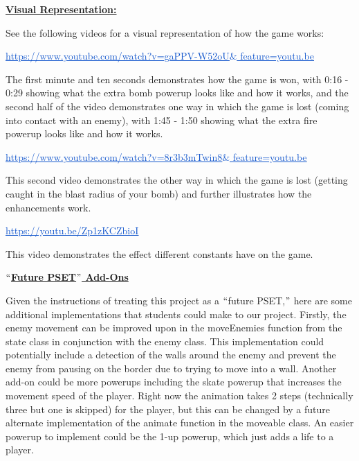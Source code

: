 \documentclass[12pt]{article}
\begin{document}
\vspace{\baselineskip}
\textbf{\uline{Visual Representation:}}\par

See the following videos for a visual representation of how the game works: \par

\href{https://www.youtube.com/watch?v=gaPPV-W52oU&feature=youtu.be}{\textcolor[HTML]{1155CC}{\uline{https://www.youtube.com/watch?v=gaPPV-W52oU$\&$ feature=youtu.be}}} \par

The first minute and ten seconds demonstrates how the game is won, with 0:16 - 0:29 showing what the extra bomb powerup looks like and how it works, and the second half of the video demonstrates one way in which the game is lost (coming into contact with an enemy), with 1:45 - 1:50 showing what the extra fire powerup looks like and how it works.\par

\href{https://www.youtube.com/watch?v=8r3b3mTwin8&feature=youtu.be}{\textcolor[HTML]{1155CC}{\uline{https://www.youtube.com/watch?v=8r3b3mTwin8$\&$ feature=youtu.be}}}\par

This second video demonstrates the other way in which the game is lost (getting caught in the blast radius of your bomb) and further illustrates how the enhancements work.\par

\href{https://youtu.be/Zp1zKCZbioI}{\textcolor[HTML]{1155CC}{\uline{https://youtu.be/Zp1zKCZbioI}}}\par

This video demonstrates the effect different constants have on the game.\par


\vspace{\baselineskip}
\textbf{\uline{$``$Future PSET$"$  Add-Ons}}\par

Given the instructions of treating this project as a $``$future PSET,$"$  here are some additional implementations that students could make to our project. Firstly, the enemy movement can be improved upon in the moveEnemies function from the state class in conjunction with the enemy class. This implementation could potentially include a detection of the walls around the enemy and prevent the enemy from pausing on the border due to trying to move into a wall. Another add-on could be more powerups including the skate powerup that increases the movement speed of the player. Right now the animation takes 2 steps (technically three but one is skipped) for the player, but this can be changed by a future alternate implementation of the animate function in the moveable class. An easier powerup to implement could be the 1-up powerup, which just adds a life to a player.\par
\end{document}
